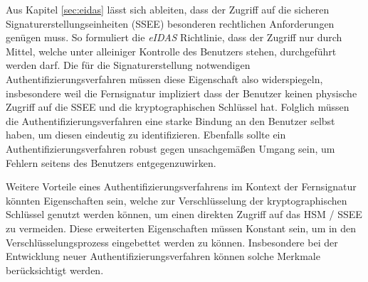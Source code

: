 \documentclass[11pt,a4paper,ngerman]{scrreprt}
\begin{document}
Aus Kapitel \ref{sec:eidas} lässt sich ableiten, dass der Zugriff auf die sicheren Signaturerstellungseinheiten (SSEE) besonderen rechtlichen Anforderungen genügen muss. So formuliert die \textit{eIDAS} Richtlinie, dass der Zugriff nur durch Mittel, welche unter alleiniger Kontrolle des Benutzers stehen, durchgeführt werden darf. Die für die Signaturerstellung notwendigen Authentifizierungsverfahren müssen diese Eigenschaft also widerspiegeln, insbesondere weil die Fernsignatur impliziert dass der Benutzer keinen physische Zugriff auf die SSEE und die kryptographischen Schlüssel hat. Folglich müssen die Authentifizierungsverfahren eine starke Bindung an den Benutzer selbst haben, um diesen eindeutig zu identifizieren. Ebenfalls sollte ein Authentifizierungsverfahren robust gegen unsachgemäßen Umgang sein, um Fehlern seitens des Benutzers entgegenzuwirken.

Weitere Vorteile eines Authentifizierungsverfahrens im Kontext der Fernsignatur könnten Eigenschaften sein, welche zur Verschlüsselung der kryptographischen Schlüssel genutzt werden können, um einen direkten Zugriff auf das HSM / SSEE zu vermeiden. Diese erweiterten Eigenschaften müssen Konstant sein, um in den Verschlüsselungsprozess eingebettet werden zu können. Insbesondere bei der Entwicklung neuer Authentifizierungsverfahren können solche Merkmale berücksichtigt werden. 
\end{document}
